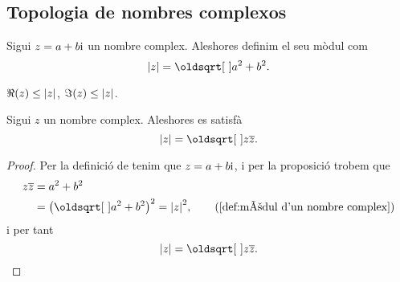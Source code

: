 \documentclass[../../Main.tex]{subfiles}
\begin{document}
	\subsection{Topologia de nombres complexos}
	\begin{definition}
		\label{def:mòdul d'un nombre complex}
		Sigui \(z = a+b\mathrm{i}\) un nombre complex.
        Aleshores definim el seu mòdul com
		\[
            \modul{z} = \sqrt{a^{2}+b^{2}}.
        \]
	\end{definition}
	\begin{observation}
		\label{obs:les parts real i imaginàries d'un complex són menors que el seu mòdul}
		\label{obs:la part real d'un complex és menor que el seu mòdul}
		\label{obs:la part imaginària d'un complex és menor que el seu mòdul}
		\(\Re(z) \leq \modul{z}\), \(\Im(z) \leq \modul{z}\).
	\end{observation}
	\begin{proposition}
		\label{prop:el mòdul d'un nombre complex és l'arrel del nombre pel seu conjugat}
		Sigui \(z\) un nombre complex.
        Aleshores es satisfà
		\[
            \modul{z} = \sqrt{z\conjugat{z}}.
        \]
		\begin{proof}
			Per la definició de  tenim que \(z = a+b\mathrm{i}\), i per la proposició  trobem que
			\begin{align*}
				z\conjugat{z} &= a^{2}+b^{2} \\
				 &= \big(\sqrt{a^{2}+b^{2}}\big)^{2} = \modul{z}^{2}, \tag{\ref{def:mòdul d'un nombre complex}}
			\end{align*}
			i per tant 
			\[
                \modul{z} = \sqrt{z\conjugat{z}}.\qedhere
            \]
		\end{proof}
	\end{proposition}
\end{document}
